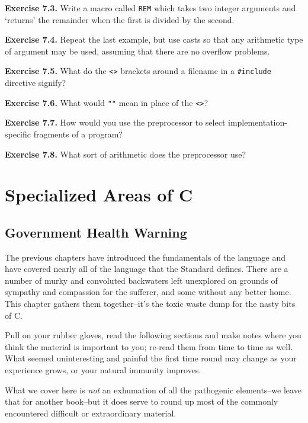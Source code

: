   \textbf{Exercise 7.3.} Write a macro called \texttt{REM} which takes
   two integer arguments and `returns' the remainder when the first
   is divided by the second.


  \textbf{Exercise 7.4.} Repeat the last example, but use casts so that any
   arithmetic type of argument may be used, assuming that there are no
   overflow problems.


  \textbf{Exercise 7.5.} What do the \texttt{<>} brackets around
   a filename in a \texttt{\#include} directive signify?


  \textbf{Exercise 7.6.} What would \texttt{""} mean in place of
   the \texttt{<>}?


  \textbf{Exercise 7.7.} How would you use the preprocessor to select
   implementation-specific fragments of a program?


  \textbf{Exercise 7.8.} What sort of arithmetic does the preprocessor
   use?


 \chapter{Specialized Areas of C}


        \section{Government Health Warning}
        

  

  The previous chapters have introduced the fundamentals of the language
   and have covered nearly all of the language that the Standard defines.
   There are a number of murky and convoluted backwaters left unexplored on
   grounds of sympathy and compassion for the sufferer, and some without any
   better home. This chapter gathers them together--it's the toxic waste
   dump for the nasty bits of C.


  Pull on your rubber gloves, read the following sections and make notes
   where you think the material is important to you; re-read them from time
   to time as well. What seemed uninteresting and painful the first time
   round may change as your experience grows, or your natural immunity
   improves.


  What we cover here is \textit{not} an exhumation of all the pathogenic
   elements--we leave that for another book--but it does serve to
   round up most of the commonly encountered difficult or extraordinary
   material.


